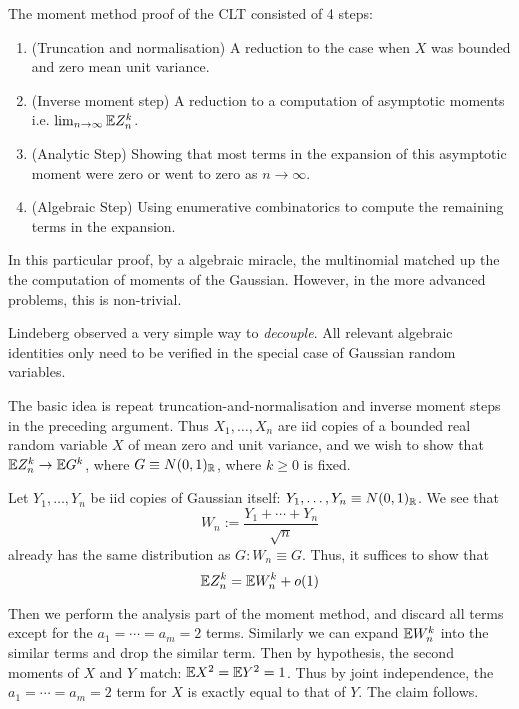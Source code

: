 The moment method proof of the CLT consisted of 4 steps:
\begin{enumerate}
    \item (Truncation and normalisation) A reduction to the case when $X$ was bounded and zero mean unit variance.
    \item (Inverse moment step) A reduction to a computation of asymptotic moments i.e. $\lim_{n\to \infty} \mathbb{E} Z_n^k$.
    \item (Analytic Step) Showing that most terms in the expansion of this asymptotic moment were zero or went to zero as $n\to \infty$.
    \item (Algebraic Step) Using enumerative combinatorics to compute the remaining terms in the expansion.
\end{enumerate}

In this particular proof, by a algebraic miracle, the multinomial matched up the the computation of moments of the Gaussian. However, in the more advanced problems, this is non-trivial. 

Lindeberg observed a very simple way to \textit{decouple}. All relevant algebraic identities only need to be verified in the special case of Gaussian random variables. 

The basic idea is repeat truncation-and-normalisation and inverse moment steps in the preceding argument. Thus $X_1,\dots,X_n$ are iid copies of a bounded real random variable $X$ of mean zero and unit variance, and we wish to show that $\mathbb{E} Z_n^k\to \mathbb{E} G^k$, where $G\equiv N(0,1)_{\mathbb{R}}$, where $k\geq 0$ is fixed. 

Let $Y_1,\dots,Y_n$ be iid copies of Gaussian itself: $Y_1,\dots,Y_n\equiv N(0,1)_{\mathbb{R}}$. We see that 
\begin{equation*}
    W_n := \frac{Y_1+\cdots+Y_n}{\sqrt{n}}
\end{equation*}
already has the same distribution as $G:W_n\equiv G$. Thus, it suffices to show that 
\begin{equation*}
    \mathbb{E} Z_n^k = \mathbb{E} W_n^k +o(1)
\end{equation*}

Then we perform the analysis part of the moment method, and discard all terms except for the $a_1=\cdots=a_m=2$ terms. Similarly we can expand $\mathbb{E} W_n^k$ into the similar terms and drop the similar term. Then by hypothesis, the second moments of $X$ and $Y$ match: $\mathbb{E} X^2 =\mathbb{E} Y^2 = 1$. Thus by joint independence, the $a_1 = \cdots = a_m =2$ term for $X$ is exactly equal to that of $Y$. The claim follows.

